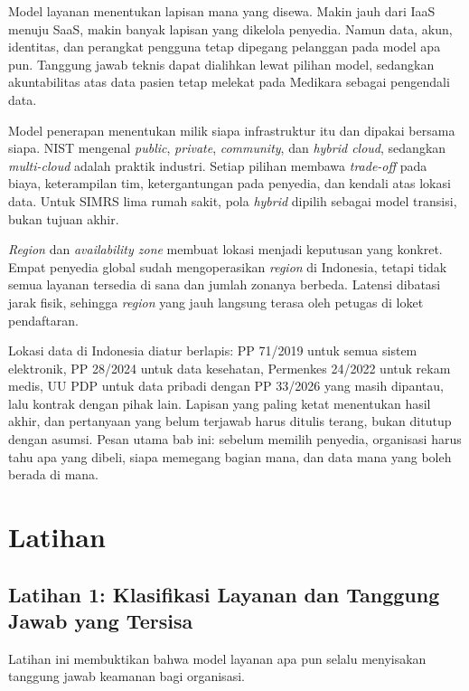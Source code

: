 Model layanan menentukan lapisan mana yang disewa. Makin jauh dari IaaS menuju SaaS, makin
banyak lapisan yang dikelola penyedia. Namun data, akun, identitas, dan perangkat pengguna
tetap dipegang pelanggan pada model apa pun. Tanggung jawab teknis dapat dialihkan lewat
pilihan model, sedangkan akuntabilitas atas data pasien tetap melekat pada Medikara sebagai
pengendali data.

Model penerapan menentukan milik siapa infrastruktur itu dan dipakai bersama siapa. NIST
mengenal \textit{public}, \textit{private}, \textit{community}, dan \textit{hybrid cloud},
sedangkan \textit{multi-cloud} adalah praktik industri. Setiap pilihan membawa
\textit{trade-off} pada biaya, keterampilan tim, ketergantungan pada penyedia, dan kendali
atas lokasi data. Untuk SIMRS lima rumah sakit, pola \textit{hybrid} dipilih sebagai model
transisi, bukan tujuan akhir.

\textit{Region} dan \textit{availability zone} membuat lokasi menjadi keputusan yang
konkret. Empat penyedia global sudah mengoperasikan \textit{region} di Indonesia, tetapi
tidak semua layanan tersedia di sana dan jumlah zonanya berbeda. Latensi dibatasi jarak
fisik, sehingga \textit{region} yang jauh langsung terasa oleh petugas di loket
pendaftaran.

Lokasi data di Indonesia diatur berlapis: PP 71/2019 untuk semua sistem elektronik,
PP 28/2024 untuk data kesehatan, Permenkes 24/2022 untuk rekam medis, UU PDP untuk data pribadi
dengan PP 33/2026 yang masih dipantau, lalu kontrak dengan pihak lain. Lapisan yang paling ketat menentukan hasil akhir, dan pertanyaan
yang belum terjawab harus ditulis terang, bukan ditutup dengan asumsi. Pesan utama bab ini:
sebelum memilih penyedia, organisasi harus tahu apa yang dibeli, siapa memegang bagian mana,
dan data mana yang boleh berada di mana.

\section{Latihan}

\subsection*{Latihan 1: Klasifikasi Layanan dan Tanggung Jawab yang Tersisa}

Latihan ini membuktikan bahwa model layanan apa pun selalu menyisakan tanggung jawab
keamanan bagi organisasi.

